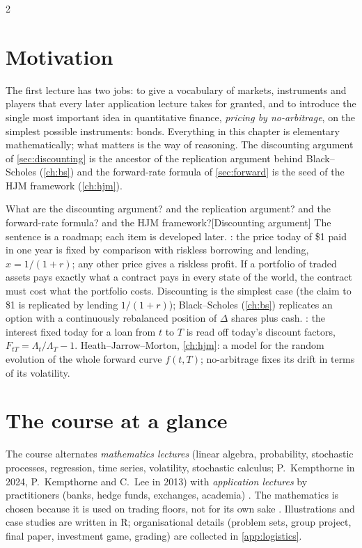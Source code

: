 \begin{paracol}{2}
\section*{Motivation}
The first lecture has two jobs: to give a vocabulary of markets, instruments and players that
every later application lecture takes for granted, and to introduce the single most important
idea in quantitative finance, \emph{pricing by no-arbitrage}, on the simplest possible
instruments: bonds. Everything in this chapter is elementary mathematically; what matters is
the way of reasoning. The discounting argument of \cref{sec:discounting} is the ancestor of
the replication argument behind Black--Scholes (\cref{ch:bs}) and the forward-rate formula
of \cref{sec:forward} is the seed of the HJM framework (\cref{ch:hjm}).
\begin{answer}{What are the discounting argument? and the replication argument? and the forward-rate formula? and the HJM framework?}[Discounting argument]
The sentence is a roadmap; each item is developed later.
: the price today of \$1 paid in one
        year is fixed by comparison with riskless borrowing and lending, $x=1/(1+r)$; any other
        price gives a riskless profit.
If a portfolio of traded assets pays exactly what a contract
        pays in every state of the world, the contract must cost what the portfolio costs.
        Discounting is the simplest case (the claim to \$1 is replicated by lending $1/(1+r)$);
        Black--Scholes (\cref{ch:bs}) replicates an option with a continuously rebalanced position
        of $\Delta$ shares plus cash.
: the interest fixed today for a loan
        from $t$ to $T$ is read off today's discount factors, $F_{tT}=\Lambda_t/\Lambda_T-1$.
Heath--Jarrow--Morton, \cref{ch:hjm}: a model for the random
        evolution of the whole forward curve $f(t,T)$; no-arbitrage fixes its drift in terms of its
        volatility.
\end{answer}

\section{The course at a glance}
The course alternates \emph{mathematics lectures} (linear algebra, probability, stochastic
processes, regression, time series, volatility, stochastic calculus; P.~Kempthorne in 2024,
P.~Kempthorne and C.~Lee in 2013) with \emph{application lectures} by practitioners
(banks, hedge funds, exchanges, academia) . The mathematics is chosen
because it is used on trading floors, not for its own sake .
Illustrations and case studies are written in R; organisational details (problem sets, group
project, final paper, investment game, grading) are collected in \cref{app:logistics}.





\end{paracol}
